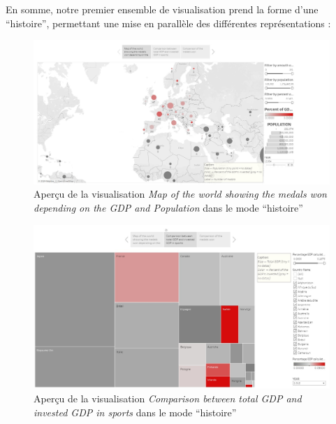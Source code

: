 \documentclass[hidelinks, 12pt]{report}
\begin{document}
En somme, notre premier ensemble de visualisation prend la forme d'une \enquote{histoire}, permettant une mise en parallèle des différentes représentations :

\begin{center}
	\begin{figure}[H]
		\centering
		\setlength{\belowcaptionskip}{-35pt}
		\includegraphics[scale=0.3]{images/datavis-medals-world-map-story.jpeg}
		\captionsetup{justification=centering}
		\caption{Aperçu de la visualisation \textit{Map of the world showing the medals won depending on the GDP and Population} dans le mode \enquote{histoire}}
	\end{figure}
\end{center}

\begin{center}
	\begin{figure}[H]
		\centering
		\setlength{\belowcaptionskip}{-35pt}
		\includegraphics[scale=0.3]{images/datavis-medals-world-treemap-story.jpeg}
		\captionsetup{justification=centering}
		\caption{Aperçu de la visualisation \textit{Comparison between total GDP and invested GDP in sports} dans le mode \enquote{histoire}}
	\end{figure}
\end{center}
\end{document}

